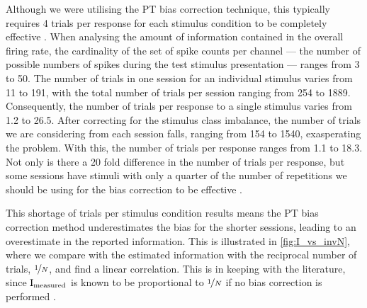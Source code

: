 
Although we were utilising the \ac{PT} bias correction technique, this typically requires \num{4} trials per response for each stimulus condition to be completely effective \citep{Panzeri2007}.
When analysing the amount of information contained in the overall firing rate, the cardinality of the set of spike counts per channel --- the number of possible numbers of spikes during the test stimulus presentation --- ranges from \num{3} to \num{50}.
The number of trials in one session for an individual stimulus varies from \num{11} to \num{191}, with the total number of trials per session ranging from \num{254} to \num{1889}.
Consequently, the number of trials per response to a single stimulus varies from \num{1.2} to \num{26.5}.
After correcting for the stimulus class imbalance, the number of trials we are considering from each session falls, ranging from \num{154} to \num{1540}, exasperating the problem.
With this, the number of trials per response ranges from \num{1.1} to \num{18.3}.
Not only is there a \num{20} fold difference in the number of trials per response, but some sessions have stimuli with only a quarter of the number of repetitions we should be using for the bias correction to be effective \citep{Panzeri2007}.

This shortage of trials per stimulus condition results means the \ac{PT} bias correction method underestimates the bias for the shorter sessions, leading to an overestimate in the reported information.
This is illustrated in \autoref{fig:I_vs_invN}, where we compare with the estimated information with the reciprocal number of trials, $\nicefrac{1}{N}$, and find a linear correlation.
This is in keeping with the literature, since $\operatorname{I}_{\text{measured}}$ is known to be proportional to $\nicefrac{1}{N}$ if no bias correction is performed \citep{Treves1995}.


